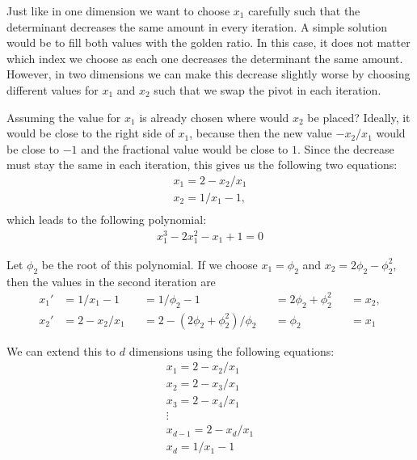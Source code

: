 \documentclass[english,version-2020-11]{uzl-thesis}
\begin{document}
Just like in one dimension we want to choose $x_1$ carefully such that the
determinant decreases the same amount in every iteration.
A simple solution would be to fill both values with the golden ratio.
In this case, it does not matter which index we choose as each one decreases
the determinant the same amount.
However, in two dimensions we can make this decrease slightly worse
by choosing different values for $x_1$ and $x_2$ such that we swap the pivot
in each iteration.

Assuming the value for $x_1$ is already chosen where would $x_2$ be placed?
Ideally, it would be close to the right side of $x_1$, because then the new
value $-x_2 / x_1$ would be close to $-1$ and the fractional value would be
close to $1$.
Since the decrease must stay the same in each iteration, this gives us the
following two equations:
\begin{align*}
  x_1 = 2 - x_2 / x_1 \\
  x_2 = 1 / x_1 - 1,\\
\end{align*}
which leads to the following polynomial:
\begin{align*}
  x_1^3 - 2x_1^2 - x_1 + 1 = 0
\end{align*}

Let $\phi_2$ be the root of this polynomial.
If we choose $x_1 = \phi_2$ and $x_2 = 2\phi_2 - \phi_2^2$,
then the values in the second iteration are
\[\begin{aligned}
  x_1' & = 1 / x_1 - 1   &  & = 1 / \phi_2 - 1                    &  & = 2\phi_2 + \phi_2^2 &  & = x_2, \\
  x_2' & = 2 - x_2 / x_1 &  & = 2 - (2\phi_2 + \phi_2^2) / \phi_2 &  & = \phi_2             &  & = x_1
\end{aligned}\]

We can extend this to $d$ dimensions using the following equations:
\begin{align*}
  x_1 = 2 - x_2 / x_1 \\
  x_2 = 2 - x_3 / x_1 \\
  x_3 = 2 - x_4 / x_1 \\
  \vdots \\
  x_{d-1} = 2 - x_d / x_1 \\
  x_d = 1 / x_1 - 1 \\
\end{align*}
\end{document}
